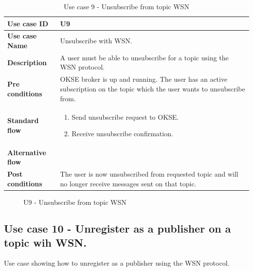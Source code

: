 \begin{table}[ht!]
\centering
\begin{tabular}{|l|p{5cm}|}
\hline
\textbf{Use case ID} & U9 \\ \hline
\textbf{Use case Name} & Unsubscribe with WSN. \\ \hline
\textbf{Description} & A user must be able to unsubscribe for a topic using the WSN protocol.  \\ \hline
\textbf{Pre conditions} & OKSE broker is up and running. The user has an active subscription on the topic which the user wants to 	unsubscribe from. \\ \hline
\textbf{Standard flow} & \begin{enumerate}
\item Send unsubscribe request to OKSE.
\item Receive unsubscribe confirmation.
\end{enumerate} \\ \hline
\textbf{Alternative flow} & \\ \hline
\textbf{Post conditions} & The user is now unsubscribed from requested topic and will no longer receive messages sent on that topic. 
  \\ \hline
\end{tabular}
\caption{Use case 9 - Unsubscribe from topic WSN}
\label{uc9}
\end{table}

\begin{center}
  \begin{figure}[ht!]
    \caption{U9 - Unsubscribe from topic WSN}
    \label{fig:u9}
  \end{figure}
\end{center}

\clearpage

\subsection{Use case 10 - Unregister as a publisher on a topic wih WSN.}
\label{subsec:requirements_engineering-use_cases-unreg_pub}

Use case showing how to unregister as a publisher using the WSN protocol. 

